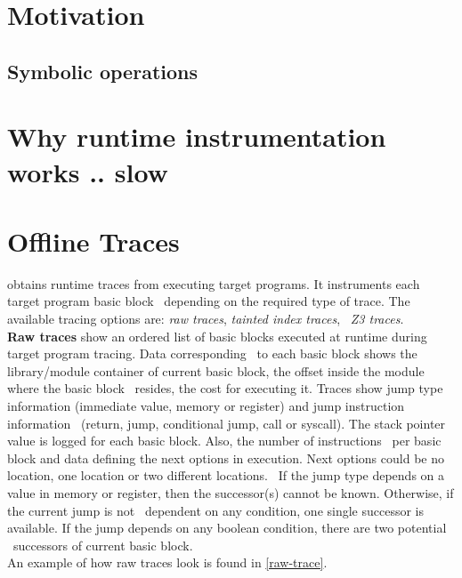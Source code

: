 \documentclass[format=acmsmall]{acmart}
\author{Teodor Stoenescu}
\affiliation{%
  \institution{Bitdefender}
  \city{Bucharest}
  \country{Romania}}
\author{Alexandra Sandulescu}
\affiliation{%
  \institution{Bitdefender}
  \city{Bucharest}
  \country{Romania}}
\title{\mytitle}
\newcommand{\allcaps}[1]{\texorpdfstring{\textsmaller[.5]{#1}}{#1}\xspace}
\newcommand{\river}{\allcaps{RIVER}}
\begin{document}
\begin{abstract}

\end{abstract}

\maketitle
\renewcommand{\shortauthors}{T. Stoenescu, A. Sandulescu}

\section{Motivation}
\subsection{Symbolic operations}\label{subsec:symbolic-operations}

\section{Why runtime instrumentation works .. slow}

\section{\river Offline Traces}\label{offline-traces}
\river obtains runtime traces from executing target programs. It instruments each target program basic block \
depending on the required type of trace. The available tracing options are: \textit{raw traces}, \textit{tainted index traces}, \
\textit{Z3 traces}. \\

\textbf{Raw traces} show an ordered list of basic blocks executed at runtime during target program tracing. Data corresponding \
to each basic block shows the library/module container of current basic block, the offset inside the module where the basic block \
resides, the cost for executing it. Traces show jump type information (immediate value, memory or register) and jump instruction information \
(return, jump, conditional jump, call or syscall). The stack pointer value is logged for each basic block. Also, the number of instructions \
per basic block and data defining the next options in execution. Next options could be no location, one location or two different locations. \
If the jump type depends on a value in memory or register, then the successor(s) cannot be known. Otherwise, if the current jump is not \
dependent on any condition, one single successor is available. If the jump depends on any boolean condition, there are two potential \
successors of current basic block. \\
An example of how raw traces look is found in \autoref{raw-trace}. \\
\end{document}
